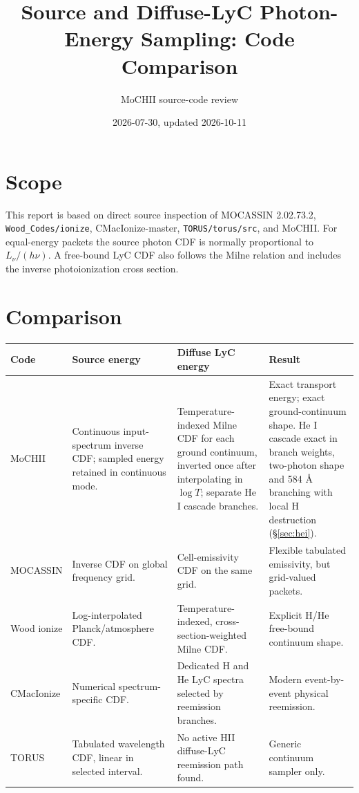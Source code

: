 \documentclass[11pt]{my_memo}
\title{Source and Diffuse-LyC Photon-Energy Sampling: Code Comparison}
\author{MoCHII source-code review}\date{2026-07-30, updated 2026-10-11}
\begin{document}
\maketitle
\section{Scope}
This report is based on direct source inspection of MOCASSIN 2.02.73.2, \texttt{Wood\_Codes/ionize}, CMacIonize-master, \texttt{TORUS/torus/src}, and MoCHII.  For equal-energy packets the source photon CDF is normally proportional to $L_\nu/(h\nu)$.  A free-bound LyC CDF also follows the Milne relation and includes the inverse photoionization cross section.
\section{Comparison}
\begin{tabularx}{\textwidth}{p{22mm}XXX}\toprule
Code&Source energy&Diffuse LyC energy&Result\\\midrule
MoCHII&Continuous input-spectrum inverse CDF; sampled energy retained in continuous mode.&Temperature-indexed Milne CDF for each ground continuum, inverted once after interpolating in $\log T$; separate He I cascade branches.&Exact transport energy; exact ground-continuum shape.  He I cascade exact in branch weights, two-photon shape and 584 \AA{} branching with local H destruction (\S\ref{sec:hei}).\\
MOCASSIN&Inverse CDF on global frequency grid.&Cell-emissivity CDF on the same grid.&Flexible tabulated emissivity, but grid-valued packets.\\
Wood ionize&Log-interpolated Planck/atmosphere CDF.&Temperature-indexed, cross-section-weighted Milne CDF.&Explicit H/He free-bound continuum shape.\\
CMacIonize&Numerical spectrum-specific CDF.&Dedicated H and He LyC spectra selected by reemission branches.&Modern event-by-event physical reemission.\\
TORUS&Tabulated wavelength CDF, linear in selected interval.&No active HII diffuse-LyC reemission path found.&Generic continuum sampler only.\\\bottomrule
\end{tabularx}
\end{document}
